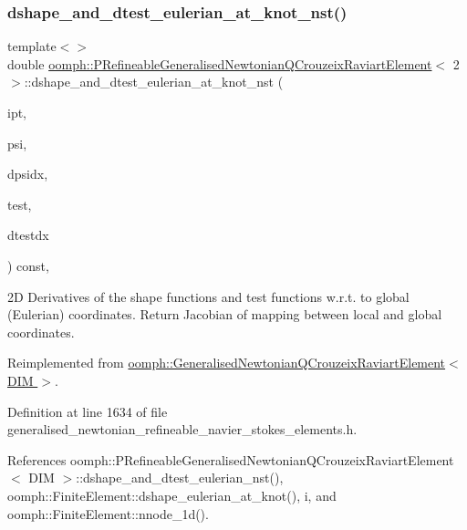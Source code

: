 \subsubsection{\texorpdfstring{dshape\+\_\+and\+\_\+dtest\+\_\+eulerian\+\_\+at\+\_\+knot\+\_\+nst()}{dshape\_and\_dtest\_eulerian\_at\_knot\_nst()}\hspace{0.1cm}{\footnotesize\ttfamily [2/3]}}
{\footnotesize\ttfamily template$<$$>$ \\
double \hyperlink{classoomph_1_1PRefineableGeneralisedNewtonianQCrouzeixRaviartElement}{oomph\+::\+P\+Refineable\+Generalised\+Newtonian\+Q\+Crouzeix\+Raviart\+Element}$<$ 2 $>$\+::dshape\+\_\+and\+\_\+dtest\+\_\+eulerian\+\_\+at\+\_\+knot\+\_\+nst (\begin{DoxyParamCaption}\item[{const unsigned \&}]{ipt,  }\item[{\hyperlink{classoomph_1_1Shape}{Shape} \&}]{psi,  }\item[{\hyperlink{classoomph_1_1DShape}{D\+Shape} \&}]{dpsidx,  }\item[{\hyperlink{classoomph_1_1Shape}{Shape} \&}]{test,  }\item[{\hyperlink{classoomph_1_1DShape}{D\+Shape} \&}]{dtestdx }\end{DoxyParamCaption}) const\hspace{0.3cm}{\ttfamily [inline]}, {\ttfamily [virtual]}}

2D Derivatives of the shape functions and test functions w.\+r.\+t. to global (Eulerian) coordinates. Return Jacobian of mapping between local and global coordinates. 

Reimplemented from \hyperlink{classoomph_1_1GeneralisedNewtonianQCrouzeixRaviartElement_a8320a0d6ad5e4f9a19ab412fb69c00e7}{oomph\+::\+Generalised\+Newtonian\+Q\+Crouzeix\+Raviart\+Element$<$ D\+I\+M $>$}.



Definition at line 1634 of file generalised\+\_\+newtonian\+\_\+refineable\+\_\+navier\+\_\+stokes\+\_\+elements.\+h.



References oomph\+::\+P\+Refineable\+Generalised\+Newtonian\+Q\+Crouzeix\+Raviart\+Element$<$ D\+I\+M $>$\+::dshape\+\_\+and\+\_\+dtest\+\_\+eulerian\+\_\+nst(), oomph\+::\+Finite\+Element\+::dshape\+\_\+eulerian\+\_\+at\+\_\+knot(), i, and oomph\+::\+Finite\+Element\+::nnode\+\_\+1d().

\mbox{\label{classoomph_1_1PRefineableGeneralisedNewtonianQCrouzeixRaviartElement_a7c700df3e0225e2b5a26441730f5fb51}} 
